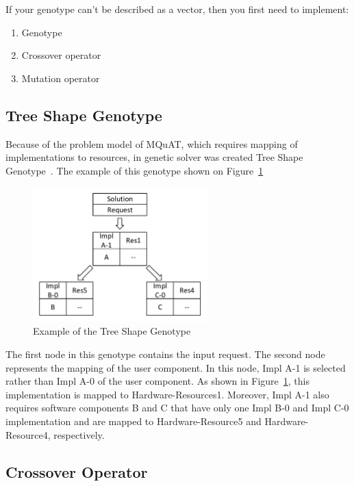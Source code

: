 If your genotype can't be described as a vector, then you first need to implement:

\begin{enumerate}
	\item Genotype
	\item Crossover operator
	\item Mutation operator
\end{enumerate}

\subsection{Tree Shape Genotype}

Because of the problem model of MQuAT, which requires mapping of implementations to resources, in genetic solver was created Tree Shape Genotype~\cite{ahmad18}.
The example of this genotype shown on Figure~\ref{fig:TreeShapeGenotypeExample}

\begin{figure}
	\centering
	\includegraphics[width=0.6\textwidth]{images/TreeShapeGenotypeExample.pdf}
	\caption[Example of the Tree Shape Genotype]{Example of the Tree Shape Genotype}
	\label{fig:TreeShapeGenotypeExample}
\end{figure}

The first node in this genotype contains the input request. The second node represents the mapping of the user component. In this node, Impl A-1 is selected rather than Impl A-0 of the user component. As shown in Figure~\ref{fig:TreeShapeGenotypeExample}, this implementation is mapped to Hardware-Resources1. Moreover, Impl A-1 also requires software components B and C that have only one Impl B-0 and Impl C-0 implementation and are mapped to Hardware-Resource5 and Hardware-Resource4, respectively.

\subsection{Crossover Operator}
\label{sec:GeneticSolverCrossover}

